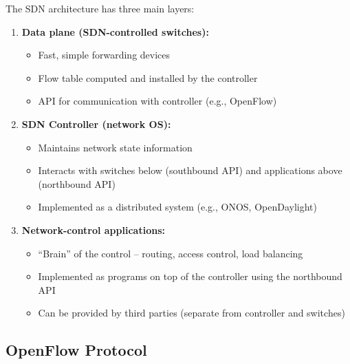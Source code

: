 \begin{keybox}
The SDN architecture has three main layers:
\begin{enumerate}[noitemsep]
    \item \textbf{Data plane (SDN-controlled switches):}
    \begin{itemize}[noitemsep]
        \item Fast, simple forwarding devices
        \item Flow table computed and installed by the controller
        \item API for communication with controller (e.g., OpenFlow)
    \end{itemize}
    \item \textbf{SDN Controller (network OS):}
    \begin{itemize}[noitemsep]
        \item Maintains network state information
        \item Interacts with switches below (southbound API) and applications above (northbound API)
        \item Implemented as a distributed system (e.g., ONOS, OpenDaylight)
    \end{itemize}
    \item \textbf{Network-control applications:}
    \begin{itemize}[noitemsep]
        \item ``Brain'' of the control -- routing, access control, load balancing
        \item Implemented as programs on top of the controller using the northbound API
        \item Can be provided by third parties (separate from controller and switches)
    \end{itemize}
\end{enumerate}
\end{keybox}

\begin{imagebox}
\end{imagebox}

\subsection{OpenFlow Protocol}

